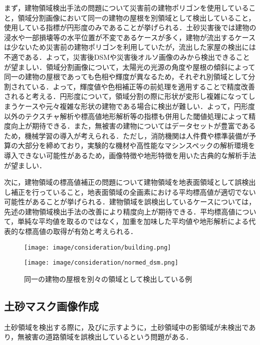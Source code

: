       まず，建物領域検出手法の問題について災害前の建物ポリゴンを使用していること，領域分割画像において同一の建物の屋根を別領域として検出していること，使用している指標が円形度のみであることが挙げられる．土砂災害後では建物の浸水や一部損壊等の水平位置が不変であるケースが多く，建物が流出するケースは少ないため災害前の建物ポリゴンを利用していたが，流出した家屋の検出には不適である．よって，災害後DSMや災害後オルソ画像のみから検出できることが望ましい．領域分割画像について，太陽光の光源の角度や屋根の傾斜によって同一の建物の屋根であっても色相や輝度が異なるため，それぞれ別領域として分割されている．よって，輝度値や色相補正等の前処理を適用することで精度改善されると考える．円形度について，領域分割の際に形状が変形し複雑になってしまうケースや元々複雑な形状の建物である場合に検出が難しい．よって，円形度以外のテクスチャ解析や標高値地形解析等の指標も併用した閾値処理によって精度向上が期待できる．また，無被害の建物についてはデータセットが豊富であるため，機械学習の導入が考えられる．ただし，消防機関は人件費や標準装備が予算の大部分を締めており，実験的な機材や高性能なマシンスペックの解析環境を導入できない可能性があるため，画像特徴や地形特徴を用いた古典的な解析手法が望ましい\cite{消防白書}．

      次に，建物領域の標高値補正の問題について建物領域を地表面領域として誤検出し補正を行っていること，地表面領域の全画素における平均標高値が適切でない可能性があることが挙げられる．建物領域を誤検出しているケースについては，先述の建物領域検出手法の改善により精度向上が期待できる．平均標高値について，単純な平均値を取るのではなく，加重を加味した平均値や地形解析による代表的な標高値の取得が有効と考えられる．

      \begin{figure}[t]
        \begin{minipage}[c]{0.45\hsize}
          \centering
          \texttt{[image: image/consideration/building.png]}
        \end{minipage}
        \begin{minipage}[c]{0.45\hsize}
          \centering
          \texttt{[image: image/consideration/normed\_dsm.png]}
        \end{minipage}
        \caption{同一の建物の屋根を別々の領域として検出している例}
        \label{建物領域低精度例}
      \end{figure}      


    \subsection*{土砂マスク画像作成}
      土砂領域を検出する際に，及びに示すように，土砂領域中の影領域が未検出であり，無被害の道路領域を誤検出しているという問題がある．

